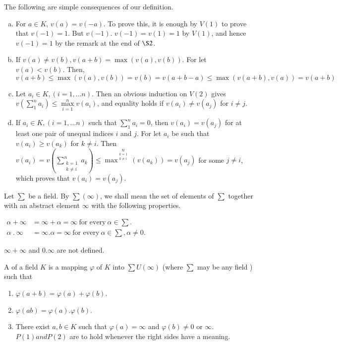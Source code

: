 The following are simple consequences of our definition.
\begin{enumerate}[(a)]
\item For $a \in K $,  \quad $v(a) = v(-a)$. To prove this, it is
  enough by $V(1)$ to prove that $v(-1) = 1$. But $v(-1)$. $v(-1) = v(1) = 1$ by
  $V(1)$, and hence $v(-1) = 1 $ by the remark at the end of $\S 2$. 
\item If $v(a) \neq v(b), v(a+b) = \max (v(a), v(b))$. For let $v(a) <
  v(b)$. Then, $v(a+b) \le \max (v(a), v(b)) = v(b) = v(a+b-a) \le
  \max (v(a+b), v(a)) = v(a+b)$ 
\item Let $a_i \in K, (i = 1, \ldots n)$. Then an obvious induction on
  $V(2)$ gives $v (\sum\limits^n_1 a_i) \le \max\limits^n_{i=1}
  v(a_i)$, and equality holds if $v(a_i) \neq v(a_j)$ for $i \neq j$. 
\item If $a_i \in K, (i = 1, \ldots n)$ such that $\sum\limits^n_1 a_i
  = 0$, then $v(a_i) = v(a_j)$ for at least one pair of unequal
  indices $i$ and $j$. For let $a_i$ be such that $v(a_i) \ge v(a_k)$
  for $k \neq i$. Then $v(a_i) = v(\sum\limits^n_{\substack{k=1\\k
      \neq i}} a_k) \le \max^n\limits_{\substack {k = 1 \\ k \neq i}}
  (v(a_k)) = v(a_j)$ for some $j \neq i$, which proves that $v(a_i) = v(a_j)$.
\end{enumerate}

Let $\sum $ be a field. By $\sum (\infty)$, we shall mean the set
of elements of $\sum$ together with an abstract element $\infty$ with
the following properties.  

\noindent
$
\begin{aligned}
\alpha + \infty & = \infty + \alpha = \infty ~\text{for every}~\alpha \in \sum. \\
\alpha~ . ~ \infty & = \infty . \alpha = \infty ~\text{for every}~ \alpha \in
\sum, \alpha \neq 0. 
\end{aligned}
$

\noindent
$\infty + \infty $ and $0. \infty$ are not defined.
\begin{defi*}
  A of a field $K$ is a mapping $\varphi$ of $K$ into
  $\sum U (\infty)$ (where $\sum$ may be any field ) such that  
  \begin{enumerate}[\rm P(1)]
  \item $\varphi (a+b) = \varphi (a) + \varphi(b)$.
  \item $\varphi (ab) = \varphi (a). \varphi (b)$.
  \item There exist $a, b \in K $ such that $\varphi (a) = \infty$ and
    $\varphi (b) \neq 0$ or $\infty$. $P(1) and P(2)$ are to hold
    whenever the right sides have a meaning. 
  \end{enumerate}
\end{defi*}

